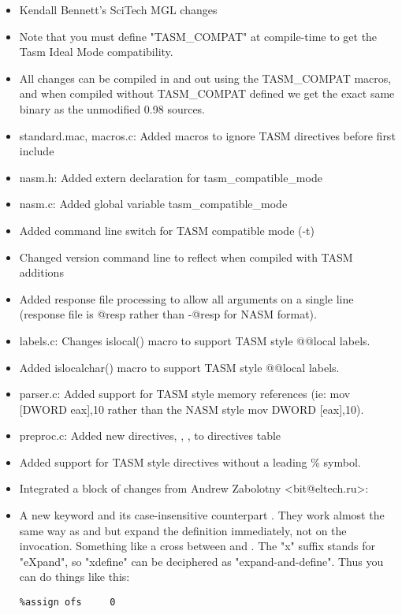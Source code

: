 \begin{itemize}
    \item{Kendall Bennett's SciTech MGL changes}
    \item{Note that you must define "TASM\_COMPAT" at compile-time
        to get the Tasm Ideal Mode compatibility.}
    \item{All changes can be compiled in and out using the TASM\_COMPAT macros,
        and when compiled without TASM\_COMPAT defined we get the exact same
        binary as the unmodified 0.98 sources.}
    \item{standard.mac, macros.c: Added macros to ignore TASM directives before
        first include}
    \item{nasm.h: Added extern declaration for tasm\_compatible\_mode}
    \item{nasm.c: Added global variable tasm\_compatible\_mode}
    \item{Added command line switch for TASM compatible mode (-t)}
    \item{Changed version command line to reflect when compiled with TASM additions}
    \item{Added response file processing to allow all arguments on a single
        line (response file is @resp rather than -@resp for NASM format).}
    \item{labels.c: Changes islocal() macro to support TASM style @@local labels.}
    \item{Added islocalchar() macro to support TASM style @@local labels.}
    \item{parser.c: Added support for TASM style memory references (ie: mov
        [DWORD eax],10 rather than the NASM style mov DWORD [eax],10).}
    \item{preproc.c: Added new directives, , ,
         to directives table}
    \item{Added support for TASM style directives without a leading \% symbol.}
    \item{Integrated a block of changes from Andrew Zabolotny <bit@eltech.ru>:}
    \item{A new keyword  and its case-insensitive counterpart
        . They work almost the same way as  and
         but expand the definition immediately, not on the invocation.
        Something like a cross between  and . The "x"
        suffix stands for "eXpand", so "xdefine" can be deciphered as "expand-and-define".
        Thus you can do things like this:
\begin{lstlisting}
%assign ofs     0


\end{lstlisting}}
\end{itemize}
